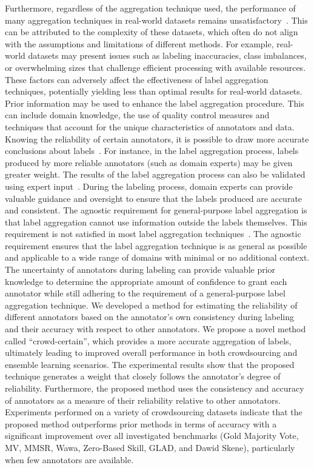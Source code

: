 \documentclass[pdflatex,bst/sn-basic]{bst/sn-jnl}%
\begin{document}
Furthermore, regardless of the aggregation technique used, the performance of many aggregation techniques in real-world datasets remains unsatisfactory~\cite{liu_Exploiting_2021}. This can be attributed to the complexity of these datasets, which often do not align with the assumptions and limitations of different methods. For example, real-world datasets may present issues such as labeling inaccuracies, class imbalances, or overwhelming sizes that challenge efficient processing with available resources. These factors can adversely affect the effectiveness of label aggregation techniques, potentially yielding less than optimal results for real-world datasets.
Prior information may be used to enhance the label aggregation procedure.
This can include domain knowledge, the use of quality control measures and techniques that account for the unique characteristics of annotators and data. Knowing the reliability of certain annotators, it is possible to draw more accurate conclusions about labels~\cite{li_Crowdsourced_2017}. For instance, in the label aggregation process, labels produced by more reliable annotators (such as domain experts) may be given greater weight. The results of the label aggregation process can also be validated using expert input~\cite{liu_Improving_2017}. During the labeling process, domain experts can provide valuable guidance and oversight to ensure that the labels produced are accurate and consistent.
The agnostic requirement for general-purpose label aggregation is that label aggregation cannot use information outside the labels themselves. This requirement is not satisfied in most label aggregation techniques~\cite{zhang_Crowdsourced_2019}. The agnostic requirement ensures that the label aggregation technique is as general as possible and applicable to a wide range of domains with minimal or no additional context.
The uncertainty of annotators during labeling can provide valuable prior knowledge to determine the appropriate amount of confidence to grant each annotator while still adhering to the requirement of a general-purpose label aggregation technique. We developed a method for estimating the reliability of different annotators based on the annotator's own consistency during labeling and their accuracy with respect to other annotators.
We propose a novel method called ``crowd-certain'', which provides a more accurate aggregation of labels, ultimately leading to improved overall performance in both crowdsourcing and ensemble learning scenarios. The experimental results show that the proposed technique generates a weight that closely follows the annotator's degree of reliability. Furthermore, the proposed method uses the consistency and accuracy of annotators as a measure of their reliability relative to other annotators. Experiments performed on a variety of crowdsourcing datasets indicate that the proposed method outperforms prior methods in terms of accuracy with a significant improvement over all investigated benchmarks (Gold Majority Vote, MV, MMSR, Wawa, Zero-Based Skill, GLAD, and Dawid Skene), particularly when few annotators are available.
\end{document}
